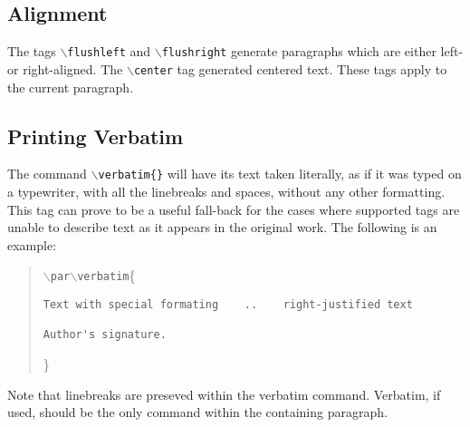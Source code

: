 \documentclass[11pt]{article}
\newcommand{\cmd}[1]{{\tt $\backslash$#1}}
\begin{document}

\subsection{Alignment}

The tags \cmd{flushleft} and \cmd{flushright} generate paragraphs
which are either left- or right-aligned. The \cmd{center} tag
generated centered text. These tags apply to the current paragraph.



\subsection{Printing Verbatim}

The command \cmd{verbatim\{\}} will have its text taken literally, as
if it was typed on a typewriter, with all the linebreaks and spaces,
without any other formatting. This tag can prove to be a useful
fall-back for the cases where supported tags are unable to describe
text as it appears in the original work. The following is an example:

\begin{quote}
  \cmd{par}\cmd{verbatim}\{
\begin{verbatim}
Text with special formating    ..    right-justified text

Author's signature.
\end{verbatim}
\}
\end{quote}

\noindent Note that linebreaks are preseved within the verbatim
command. Verbatim, if used, should be the only command within the
containing paragraph.
\end{document}
